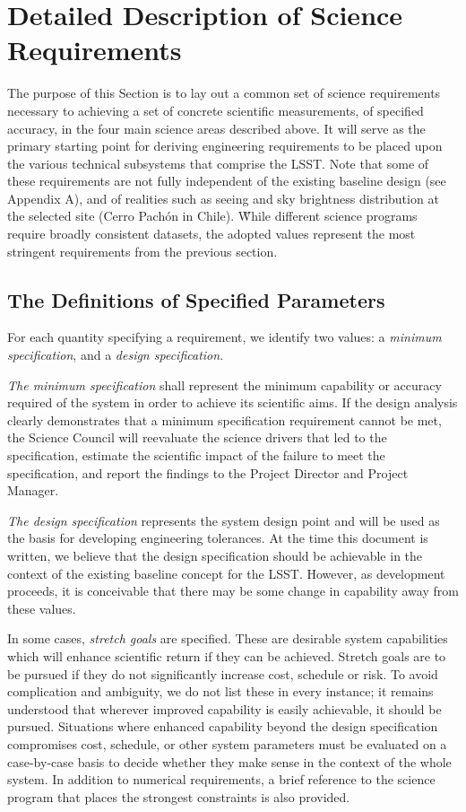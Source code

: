 \newpage
\section{Detailed Description of Science Requirements }

The purpose of this Section is to lay out a common set of science
requirements necessary to achieving a set of concrete scientific measurements,
of specified accuracy, in the four main science areas described above.  It
will serve as the primary starting point for deriving engineering
requirements to be placed upon the various technical subsystems that
comprise the LSST. Note that some of these requirements are not fully
independent of the existing baseline design (see Appendix A), and of
realities such as seeing and sky brightness distribution at the selected
site (Cerro Pach\'{o}n in Chile). \G{While different science programs
require broadly consistent datasets, the adopted values represent the
most stringent requirements from the previous section.}


\subsection{The Definitions of Specified Parameters }

For each quantity specifying a requirement, we identify two values: a {\it
minimum specification}, and a {\it design specification.}

{\it The minimum specification} shall represent the minimum capability
or accuracy required of the system in order to achieve its scientific
aims. If the design analysis clearly demonstrates that a minimum
specification requirement cannot be met, the Science Council will
reevaluate the science drivers that led to the specification, estimate
the scientific impact of the failure to meet the specification, and
report the findings to the Project Director and Project Manager.

{\it The design specification} represents the system design point and will
be used as the basis for developing engineering tolerances.  At the time
this document is written, we believe that the design specification should
be achievable in the context of the existing baseline concept for the LSST.
However, as development proceeds, it is conceivable that there may be some
change in capability away from these values.

In some cases, {\it stretch goals} are specified. These are desirable
system capabilities which will enhance scientific return if they can be
achieved. Stretch goals are to be pursued if they do not significantly
increase cost, schedule or risk. To avoid complication and ambiguity, we do
not list these in every instance; it remains understood that wherever
improved capability is easily achievable, it should be pursued.  Situations
where enhanced capability beyond the design specification compromises cost,
schedule, or other system parameters must be evaluated on a case-by-case
basis to decide whether they make sense in the context of the whole system.
In addition to numerical requirements, a brief reference to the science
program that places the strongest constraints is also provided.


